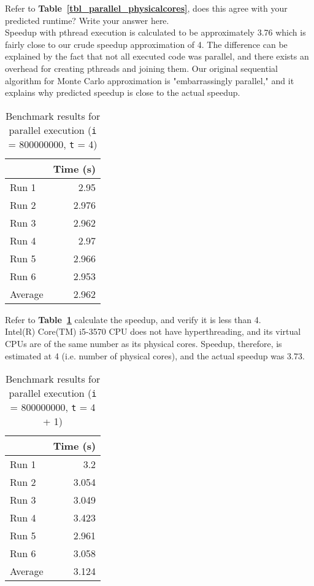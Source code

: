 \documentclass[12pt]{article}
\newcommand{\iterations}{800000000}
\newcommand{\virtualcpus}{4}
\begin{document}
Refer to {\bf Table~\ref{tbl_parallel_physicalcores}}, does this agree with your
predicted runtime? Write your answer here.
\\
\indent
Speedup with pthread execution is calculated to be approximately 3.76 which is fairly close to our crude speedup approximation of 4.
The difference can be explained by the fact that not all executed code was parallel, and there exists an overhead for creating pthreads and joining them.
Our original sequential algorithm for Monte Carlo approximation is "embarrassingly parallel," and it explains why predicted speedup is close to the actual speedup.

\begin{table}[H]
  \centering
  \begin{tabular}{lr}
    & {\bf Time (s)} \\
    \hline
    Run 1 & 2.95 \\
    Run 2 & 2.976 \\
    Run 3 & 2.962 \\
    Run 4 & 2.97 \\
    Run 5 & 2.966 \\
    Run 6 & 2.953 \\
    \hline
    Average & 2.962 \\
  \end{tabular}
  \caption{Benchmark results for parallel execution ({\tt i} = \iterations{},
    {\tt t} = \virtualcpus{})}
  \label{tbl_parallel_virtualcpus}
\end{table}

Refer to {\bf Table~\ref{tbl_parallel_virtualcpus}} calculate the speedup, and
verify it is less than \virtualcpus{}.
\\
\indent
Intel(R) Core(TM) i5-3570 CPU does not have hyperthreading, and its virtual CPUs are of the same number as its physical cores.
Speedup, therefore, is estimated at 4 (i.e. number of physical cores), and the actual speedup was 3.73.


\begin{table}[H]
  \centering
  \begin{tabular}{lr}
    & {\bf Time (s)} \\
    \hline
    Run 1 & 3.2 \\
    Run 2 & 3.054 \\
    Run 3 & 3.049 \\
    Run 4 & 3.423 \\
    Run 5 & 2.961 \\
    Run 6 & 3.058 \\
    \hline
    Average & 3.124 \\
  \end{tabular}
  \caption{Benchmark results for parallel execution ({\tt i} = \iterations{},
    {\tt t} = \virtualcpus{} + 1)}
  \label{tbl_parallel_virtualcpus_plus_one}
\end{table}
\end{document}
